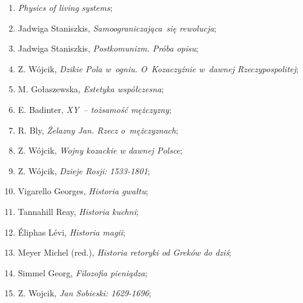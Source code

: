 \documentclass[a4paper,11pt]{article}
\begin{document}
\begin{enumerate}
\item \textit{Physics of living systems};



\item Jadwiga Staniszkis, \textit{Samoograniczająca~się rewolucja};



\item Jadwiga Staniszkis, \textit{Postkomunizm. Próba opisu};



\item Z. Wójcik, \textit{Dzikie Pola w~ogniu. O~Kozaczyźnie w~dawnej
    Rzeczypospolitej};




\item M. Gołaszewska, \textit{Estetyka współczesna};



\item E. Badinter, \textit{XY~-- tożsamość mężczyzny};



\item R. Bly, \textit{Żelazny Jan. Rzecz o~mężczyznach};



\item Z. Wójcik, \textit{Wojny kozackie w dawnej Polsce};



\item Z. Wójcik, \textit{Dzieje Rosji: 1533-1801};



\item Vigarello Georges, \textit{Historia gwałtu};



\item Tannahill Reay, \textit{Historia kuchni};



\item Éliphas Lévi, \textit{Historia magii};



\item Meyer Michel (red.), \textit{Historia retoryki od Greków do dziś};



\item Simmel Georg, \textit{Filozofia pieniądza};



\item Z. Wojcik, \textit{Jan Sobieski: 1629-1696};




\end{enumerate}
\end{document}
